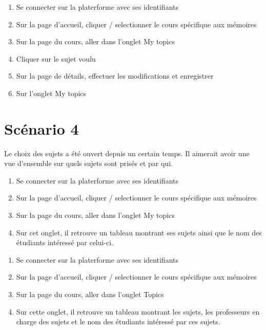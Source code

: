 \documentclass[a4paper, 11pt]{article}
\begin{document}
\begin{tcolorbox}
    \begin{enumerate}
        \item Se connecter sur la platerforme avec ses identifiants
        \item Sur la page d'accueil, cliquer / selectionner le cours spécifique aux mémoires
        \item Sur la page du cours, aller dans l'onglet \og My topics\fg{}
        \item Cliquer sur le sujet voulu
        \item Sur la page de détails, effectuer les modifications et enregistrer
        \item Sur l'onglet \og My topics\fg{}
    \end{enumerate}
\end{tcolorbox}



\section*{Scénario 4}
Le choix des sujets a été ouvert depuis un certain temps. Il aimerait avoir une vue d'ensemble sur quels sujets sont prisés et par qui.

\begin{tcolorbox}[title=Si le professeur souhaite voir l'état de ses sujets]
    \begin{enumerate}
        \item Se connecter sur la platerforme avec ses identifiants
        \item Sur la page d'accueil, cliquer / selectionner le cours spécifique aux mémoires
        \item Sur la page du cours, aller dans l'onglet \og My topics\fg{}
        \item Sur cet onglet, il retrouve un tableau montrant ses sujets ainsi que le nom des étudiants intéressé par celui-ci.
    \end{enumerate}
\end{tcolorbox}

\begin{tcolorbox}[title=Si le professeur est le gérant du cours et souhaite voir l'avancement général des choses]
    \begin{enumerate}
        \item Se connecter sur la platerforme avec ses identifiants
        \item Sur la page d'accueil, cliquer / selectionner le cours spécifique aux mémoires
        \item Sur la page du cours, aller dans l'onglet \og Topics\fg{}
        \item Sur cette onglet, il retrouve un tableau montrant les sujets, les professeurs en charge des sujets et le nom des étudiants intéressé par ces sujets.
    \end{enumerate}
\end{tcolorbox}
\end{document}
